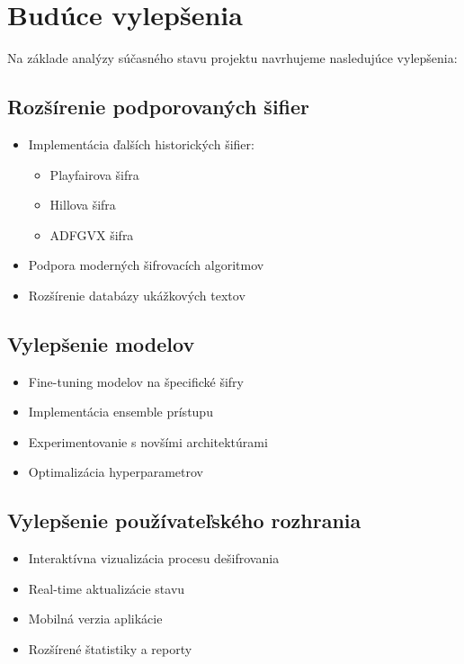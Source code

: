 \documentclass[12pt,a4paper]{article}
\begin{document}
\section{Budúce vylepšenia}
Na základe analýzy súčasného stavu projektu navrhujeme nasledujúce vylepšenia:

\subsection{Rozšírenie podporovaných šifier}
\begin{itemize}
    \item Implementácia ďalších historických šifier:
    \begin{itemize}
        \item Playfairova šifra
        \item Hillova šifra
        \item ADFGVX šifra
    \end{itemize}
    \item Podpora moderných šifrovacích algoritmov
    \item Rozšírenie databázy ukážkových textov
\end{itemize}

\subsection{Vylepšenie modelov}
\begin{itemize}
    \item Fine-tuning modelov na špecifické šifry
    \item Implementácia ensemble prístupu
    \item Experimentovanie s novšími architektúrami
    \item Optimalizácia hyperparametrov
\end{itemize}

\subsection{Vylepšenie používateľského rozhrania}
\begin{itemize}
    \item Interaktívna vizualizácia procesu dešifrovania
    \item Real-time aktualizácie stavu
    \item Mobilná verzia aplikácie
    \item Rozšírené štatistiky a reporty
\end{itemize}
\end{document}
